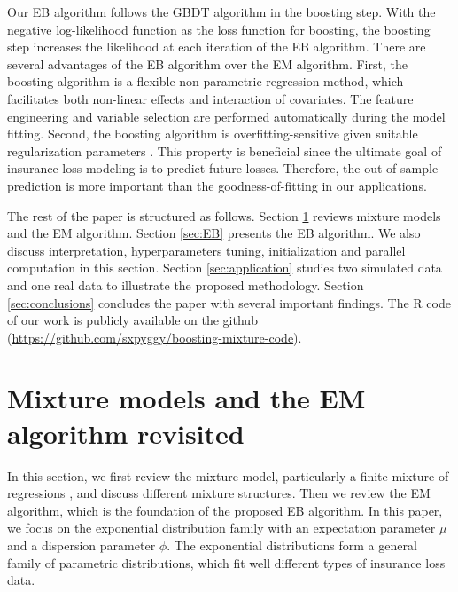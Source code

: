 \documentclass[11pt]{article}
\numberwithin{equation}{section}
\begin{document}
Our EB algorithm follows the GBDT algorithm in the boosting step.
With the negative log-likelihood function as the loss function for boosting, the boosting step increases the likelihood at each iteration of the EB algorithm. 
There are several advantages of the EB algorithm over the EM algorithm. 
First, the boosting algorithm is a flexible non-parametric regression method, which facilitates both non-linear effects and interaction of covariates. 
The feature engineering and variable selection are performed automatically during the model fitting. 
Second, the boosting algorithm is overfitting-sensitive given suitable regularization parameters \citep{buehlmann:2003}. This property is beneficial since the ultimate goal of insurance loss modeling is to predict future losses. Therefore,
the out-of-sample prediction is more important than the goodness-of-fitting in our applications. 


The rest of the paper is structured as follows. 
Section \ref{sec:review} reviews mixture models and the EM algorithm. 
Section \ref{sec:EB} presents the EB algorithm. We also discuss interpretation, hyperparameters tuning, initialization and parallel computation in this section.   
Section \ref{sec:application} studies two simulated data and one real data to illustrate the proposed methodology. 
Section \ref{sec:conclusions} concludes the paper with several important findings.  The R code of our work is publicly available on the github (\url{https://github.com/sxpyggy/boosting-mixture-code}).


\section{Mixture models and the EM algorithm revisited}\label{sec:review}

In this section, we first review the mixture model, particularly a finite mixture of regressions \citep{peel2000finite}, and discuss different mixture structures. 
Then we review the EM algorithm, which is the foundation of the proposed EB algorithm. 
In this paper, we focus on the exponential distribution family with an expectation parameter $\mu$ and a dispersion parameter $\phi$. 
The exponential distributions form a general family of parametric distributions, which fit well different types of insurance loss data.
\end{document}
